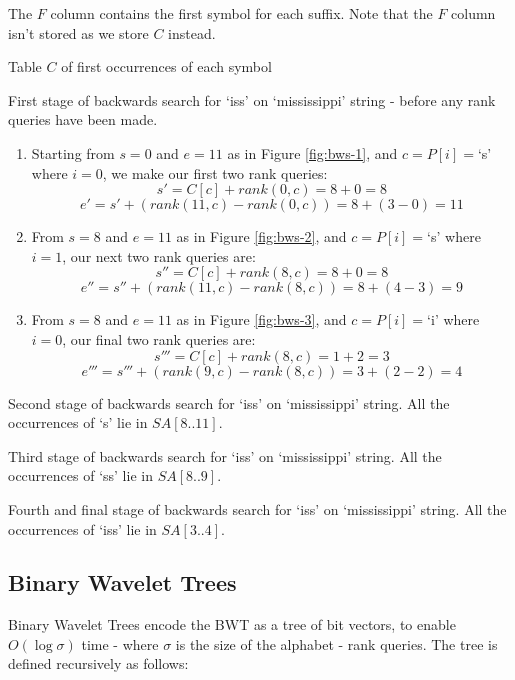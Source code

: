 The $F$ column contains the first symbol for each suffix. Note that the $F$ 
column isn't stored as we store $C$ instead.

			{Table $C$ of first occurrences of each symbol}
			
			{First stage of backwards search for `iss' on `mississippi'
			 string - before any rank queries have been made.}


\begin{enumerate}
	\item
		Starting from $s = 0$ and $e = 11$ as in Figure \ref{fig:bws-1},
		and $c = P[i] = $`s' where $i = 0$, we make our first two rank queries:
			$$s' = C[c] + rank(0, c) = 8 + 0 = 8$$
			$$e' = s' + (rank(11, c) - rank(0, c)) = 8 + (3 - 0) = 11$$
	\item
		From $s = 8$ and $e = 11$ as in Figure \ref{fig:bws-2},
		and $c = P[i] = $`s' where $i = 1$, our next two rank queries are:
			$$s'' = C[c] + rank(8, c) = 8 + 0 = 8$$
			$$e'' = s'' + (rank(11, c) - rank(8, c)) = 8 + (4 - 3) = 9$$
	\item
		From $s = 8$ and $e = 11$ as in Figure \ref{fig:bws-3},
		and $c = P[i] = $`i' where $i = 0$, our final two rank queries are:
			$$s''' = C[c] + rank(8, c) = 1 + 2 = 3$$
			$$e''' = s''' + (rank(9, c) - rank(8, c)) = 3 + (2 - 2) = 4$$
\end{enumerate}

			{Second stage of backwards search for `iss' on `mississippi'
			string. All the occurrences of `s' lie in $SA[8..11]$.}

			{Third stage of backwards search for `iss' on `mississippi'
			string. All the occurrences of `ss' lie in $SA[8..9]$.}

			{Fourth and final stage of backwards search for `iss' on
			`mississippi' string. All the occurrences of `iss' lie in
			$SA[3..4]$.}

\clearpage
\subsection{Binary Wavelet Trees}
Binary Wavelet Trees encode the BWT as a tree of bit vectors, to enable
$O(\log \sigma)$ time - where $\sigma$ is the size of the alphabet - rank queries. The tree is defined recursively as follows:

